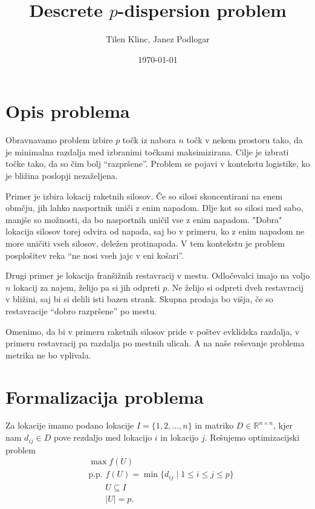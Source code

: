\documentclass{article}
\title{Descrete $p$-dispersion problem}
\author{Tilen Klinc, Janez Podlogar}
\date{\today}
\begin{document}
    
\maketitle

\section{Opis problema}

Obravnavamo problem izbire $ p $ točk iz nabora $ n $ točk v nekem prostoru
tako, da je minimalna razdalja med izbranimi točkami maksimizirana. Cilje je
izbrati točke tako, da so čim bolj ``razpršene''. Problem se pojavi v kontekstu
logistike, ko je bližina poslopji nezaželjena.


Primer je izbira lokacij raketnih silosov. Če so silosi skoncentirani na enem
obmčju, jih lahko nasportnik uniči z enim napadom. Dlje kot so silosi med sabo,
manjše so možnosti, da bo nasportnih uničil vse z enim napadom. "Dobra" lokacija
silosov torej odvira od napada, saj bo v primeru, ko z enim napadom ne more uničiti
vseh silosov, deležen protinapada. V tem kontekstu je problem posplošitev reka 
``ne nosi vseh jajc v eni košari''.

Drugi primer je lokacija franšižnih restavracij v mestu. Odločevalci imajo na voljo $ n $
lokacij za najem, želijo pa si jih odpreti $ p $. Ne želijo si odpreti dveh restavracij
v bližini, saj bi si delili isti bazen strank. Skupna prodaja bo višja, če so restavracije
``dobro razpršene'' po mestu.

Omenimo, da bi v primeru raketnih silosov pride v poštev evklidska razdalja, v primeru
restavracij pa razdalja po mestnih ulicah. A na naše reševanje problema metrika ne bo 
vplivala.

\section{Formalizacija problema}

Za lokacije imamo podano lokacije $ I = \{ 1, 2, \ldots, n \} $ in matriko $ D \in 
\mathbb{R}^{n \times n} $, kjer nam $ d_{ij} \in D $ pove rezdaljo med lokacijo $ i $
in lokacijo $ j $. Rešujemo optimizacijski problem
\begin{align*}
    & \max f(U) \\
    & \text{p.p. } f(U) = \min \{ d_{ij} \mid 1 \leq i \leq j \leq p \} \\
    & \qquad U \subseteq I \\
    & \qquad |U| = p .
\end{align*}
\end{document}
